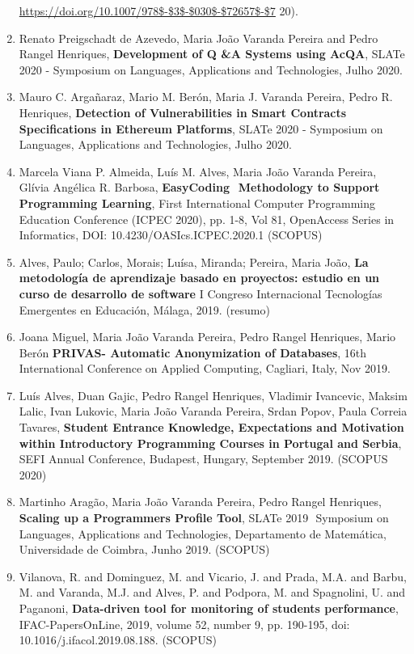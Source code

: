 \documentclass[11pt]{article}
\begin{document}
\begin{enumerate}
{\url{https://doi.org/10.1007/978$-$3$-$030$-$72657$-$7} 20).}
\item{Renato Preigschadt de Azevedo, Maria João Varanda Pereira and Pedro Rangel Henriques, {
\bf{ Development of Q
\&A Systems using AcQA}}, SLATe 2020 - Symposium on Languages, Applications and Technologies, Julho 2020. }
\item{Mauro C. Argañaraz, Mario M. Berón, Maria J. Varanda Pereira, Pedro R. Henriques, {
\bf{ Detection of Vulnerabilities in Smart Contracts Specifications in Ethereum Platforms}}, SLATe 2020 - Symposium on Languages, Applications and Technologies, Julho 2020.}
\item{Marcela Viana P. Almeida, Luís M. Alves, Maria João Varanda Pereira, Glívia Angélica R. Barbosa, {
\bf{ EasyCoding  Methodology to Support Programming Learning}}, First International Computer Programming Education Conference (ICPEC 2020), pp. 1-8, Vol 81, OpenAccess Series in Informatics, DOI: 10.4230/OASIcs.ICPEC.2020.1 (SCOPUS)}
\item{Alves, Paulo; Carlos, Morais; Luísa, Miranda; Pereira, Maria João, {
\bf{ La metodología de aprendizaje basado en proyectos: estudio en un curso de desarrollo de software}} I Congreso Internacional Tecnologías Emergentes en Educación, Málaga, 2019. (resumo)}
\item{Joana Miguel, Maria João Varanda Pereira, Pedro Rangel Henriques, Mario Berón {
\bf{ PRIVAS- Automatic Anonymization of Databases}}, 16th International Conference on Applied Computing, Cagliari, Italy, Nov 2019. }
\item{Luís Alves, Duan Gajic,  Pedro Rangel Henriques, Vladimir Ivancevic, Maksim Lalic, Ivan Lukovic, Maria João Varanda Pereira, Srdan Popov, Paula Correia Tavares, {
\bf{ Student Entrance Knowledge, Expectations and Motivation within Introductory Programming Courses in Portugal and Serbia}},  SEFI Annual Conference, Budapest, Hungary, September 2019. (SCOPUS 2020)}
\item{Martinho Aragão, Maria João Varanda Pereira, Pedro Rangel Henriques, {
\bf{ Scaling up a Programmers Profile Tool}},  SLATe 2019  Symposium on Languages, Applications and Technologies, Departamento de Matemática, Universidade de Coimbra, Junho 2019. (SCOPUS)}
\item{Vilanova, R. and Dominguez, M. and Vicario, J. and Prada, M.A. and Barbu, M. and Varanda, M.J. and Alves, P. and Podpora, M. and Spagnolini, U. and Paganoni, {
\bf{ Data-driven tool for monitoring of students performance}}, IFAC-PapersOnLine, 2019, volume 52, number 9, pp. 190-195, doi: 10.1016/j.ifacol.2019.08.188. (SCOPUS)}

\end{enumerate}
\end{document}
